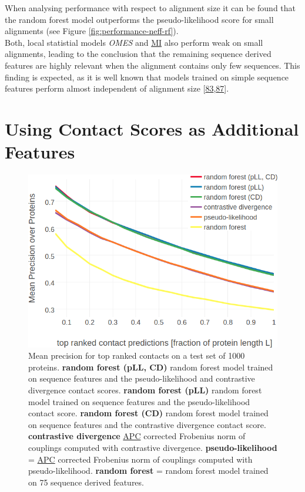 \documentclass[11pt,a4paper,twoside]{book}
\theoremstyle{definition}
\theoremstyle{definition}
\theoremstyle{remark}
\begin{document}
When analysing performance with respect to alignment size it can be
found that the random forest model outperforms the pseudo-likelihood
score for small alignments (see Figure \ref{fig:performance-neff-rf}).\\
Both, local statistial models \emph{OMES} and
\protect\hyperlink{abbrev}{MI} also perform weak on small alignments,
leading to the conclusion that the remaining sequence derived features
are highly relevant when the alignment contains only few sequences. This
finding is expected, as it is well known that models trained on simple
sequence features perform almost independent of alignment size
{[}\protect\hyperlink{ref-Skwark2016}{83},\protect\hyperlink{ref-Stahl2017}{87}{]}.

\section{Using Contact Scores as Additional
Features}\label{using-contact-scores-as-additional-features}















\begin{figure}
\includegraphics[width=0.9\linewidth]{img/random_forest_contact_prior/additional_contat_score_features/precision_vs_rank_rf_pll_cd} \caption{Mean precision for top
ranked contacts on a test set of 1000 proteins. \textbf{random forest
(pLL, CD)} random forest model trained on sequence features and the
pseudo-likelihood and contrastive divergence contact scores.
\textbf{random forest (pLL)} random forest model trained on sequence
features and the pseudo-likelihood contact score. \textbf{random forest
(CD)} random forest model trained on sequence features and the
contrastive divergence contact score. \textbf{contrastive divergence}
\protect\hyperlink{abbrev}{APC} corrected Frobenius norm of couplings
computed with contrastive divergence. \textbf{pseudo-likelihood} =
\protect\hyperlink{abbrev}{APC} corrected Frobenius norm of couplings
computed with pseudo-likelihood. \textbf{random forest} = random forest
model trained on 75 sequence derived features.}\label{fig:performance-rf-additional-features}
\end{figure}
\end{document}
